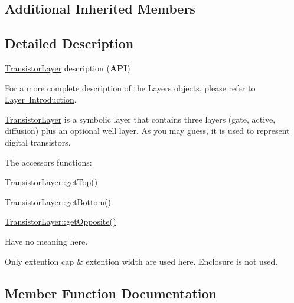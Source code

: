 \subsection*{Additional Inherited Members}


\subsection{Detailed Description}
\mbox{\hyperlink{classHurricane_1_1TransistorLayer}{Transistor\+Layer}} description ({\bfseries A\+PI}) 

For a more complete description of the Layers objects, please refer to \mbox{\hyperlink{classHurricane_1_1Layer_secLayerIntro}{Layer Introduction}}.

\mbox{\hyperlink{classHurricane_1_1TransistorLayer}{Transistor\+Layer}} is a symbolic layer that contains three layers (gate, active, diffusion) plus an optional well layer. As you may guess, it is used to represent digital transistors.

The accessors functions\+: 
\begin{DoxyItemize}
\item \mbox{\hyperlink{classHurricane_1_1Layer_a5f7c43a29f3dd02a9ebccbcbf91d6727}{Transistor\+Layer\+::get\+Top()}} 
\item \mbox{\hyperlink{classHurricane_1_1Layer_a4dab4552a219d2d900ed0b1245dc6580}{Transistor\+Layer\+::get\+Bottom()}} 
\item \mbox{\hyperlink{classHurricane_1_1Layer_a69e76c09a56260169c4f5c145a35a47f}{Transistor\+Layer\+::get\+Opposite()}} 
\end{DoxyItemize}Have no meaning here.

Only extention cap \& extention width are used here. Enclosure is not used. 

\subsection{Member Function Documentation}
\mbox{\label{classHurricane_1_1TransistorLayer_ac34a9a0c5056f1f483b670a1e929ed93}} 
